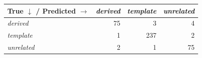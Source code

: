 \begin{tabular}{lrrr}
\toprule
True $\downarrow$ / Predicted $\rightarrow$ & \textit{derived} & \textit{template} & \textit{unrelated} \\
\midrule
\textit{derived} & 75 & 3 & 4 \\
\textit{template} & 1 & 237 & 2 \\
\textit{unrelated} & 2 & 1 & 75 \\
\bottomrule
\end{tabular}
